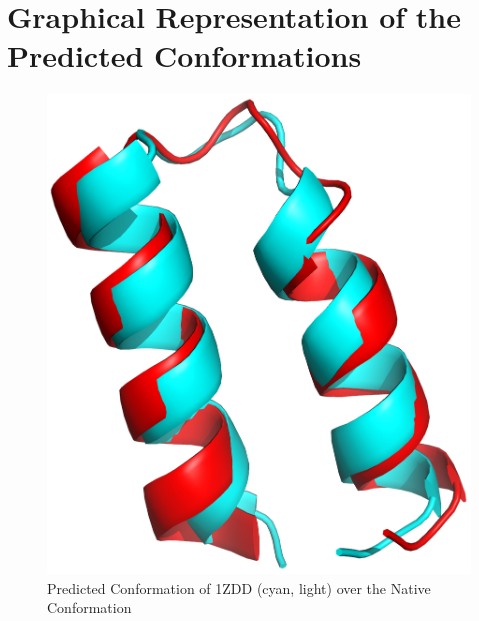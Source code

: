 \chapter{Graphical Representation of the Predicted Conformations}\label{appendix:visual}

\begin{figure}[ht]
    \centering
    \includegraphics[width=0.9\linewidth]{Figuras/1zdd_.png}
    \caption{Predicted Conformation of 1ZDD (cyan, light) over the Native Conformation}
    \label{fig:1zdd-visual}
\end{figure}

